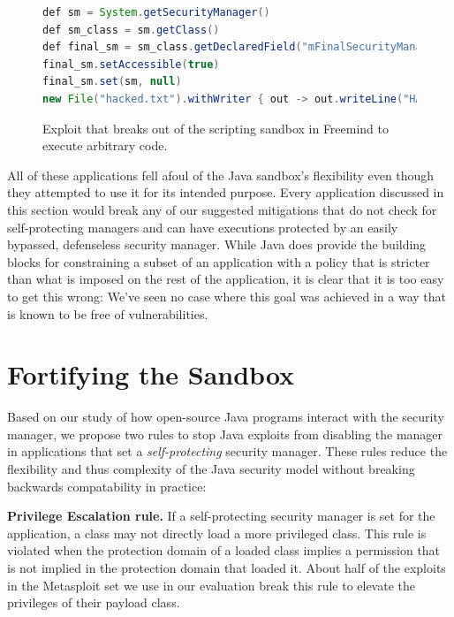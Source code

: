 \documentclass{sig-alternate}
\begin{document}
\begin{figure}
\begin{lstlisting}[language=Java,basicstyle={\scriptsize},breaklines=true]
def sm = System.getSecurityManager() 
def sm_class = sm.getClass() 
def final_sm = sm_class.getDeclaredField("mFinalSecurityManager")
final_sm.setAccessible(true) 
final_sm.set(sm, null)
new File("hacked.txt").withWriter { out -> out.writeLine("HACKED!") }
\end{lstlisting}
\caption{Exploit that breaks out of the scripting sandbox in Freemind\label{fig:Example-Exploit-for-Freemind}
to execute arbitrary code.}
\end{figure}

All of these applications fell afoul of the Java sandbox's flexibility even though they attempted to use it for its intended purpose. Every application discussed in this section would break any of our suggested mitigations that do not check for self-protecting managers and can have executions protected by an easily bypassed, defenseless security manager. While Java does provide the building blocks for constraining a subset of an application with a policy that is stricter than what is imposed on the rest of the application, it is clear that it is too easy to get this wrong: We've seen no case where this goal was achieved in a way that is known to be free of vulnerabilities.

\section{Fortifying the Sandbox}\label{sec:Rules-for-Fortifying}

Based on our study of how open-source Java programs interact with the security
manager, we propose two rules to stop Java exploits
from disabling the manager in applications that set a \emph{self-protecting}
security manager.  These rules reduce the flexibility and thus complexity of the
Java security model without breaking backwards compatability in practice:

\noindent\textbf{Privilege Escalation rule.} If a self-protecting
security manager is set for the application, a class may not directly
load a more privileged class. This rule is violated when the protection
domain of a loaded class implies a permission that is not implied
in the protection domain that loaded it. About half of the exploits in the Metasploit set we use in our evaluation
break this rule to elevate the privileges of their payload
class.
\end{document}
